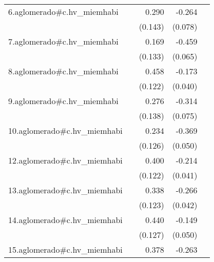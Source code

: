 {\begin{longtable}{l*{4}{D{.}{.}{-1}}}
\addlinespace
6.aglomerado#c.hv\_miemhabi&                     &       0.290\sym{*}  &      -0.264\sym{***}&                     \\
            &                     &     (0.143)         &     (0.078)         &                     \\
\addlinespace
7.aglomerado#c.hv\_miemhabi&                     &       0.169         &      -0.459\sym{***}&                     \\
            &                     &     (0.133)         &     (0.065)         &                     \\
\addlinespace
8.aglomerado#c.hv\_miemhabi&                     &       0.458\sym{***}&      -0.173\sym{***}&                     \\
            &                     &     (0.122)         &     (0.040)         &                     \\
\addlinespace
9.aglomerado#c.hv\_miemhabi&                     &       0.276\sym{*}  &      -0.314\sym{***}&                     \\
            &                     &     (0.138)         &     (0.075)         &                     \\
\addlinespace
10.aglomerado#c.hv\_miemhabi&                     &       0.234         &      -0.369\sym{***}&                     \\
            &                     &     (0.126)         &     (0.050)         &                     \\
\addlinespace
12.aglomerado#c.hv\_miemhabi&                     &       0.400\sym{**} &      -0.214\sym{***}&                     \\
            &                     &     (0.122)         &     (0.041)         &                     \\
\addlinespace
13.aglomerado#c.hv\_miemhabi&                     &       0.338\sym{**} &      -0.266\sym{***}&                     \\
            &                     &     (0.123)         &     (0.042)         &                     \\
\addlinespace
14.aglomerado#c.hv\_miemhabi&                     &       0.440\sym{***}&      -0.149\sym{**} &                     \\
            &                     &     (0.127)         &     (0.050)         &                     \\
\addlinespace
15.aglomerado#c.hv\_miemhabi&                     &       0.378\sym{**} &      -0.263\sym{***}&                     \\

\end{longtable}}
